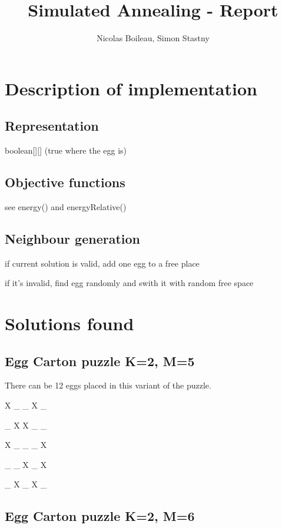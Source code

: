 \documentclass{article}
\begin{document}
\providecommand{\abs}[1]{\lvert#1\rvert}

\title{Simulated Annealing - Report}
\author{Nicolas Boileau, Simon Stastny}

\maketitle

\section{Description of implementation}

\subsection{Representation}
boolean[][] (true where the egg is)

\subsection{Objective functions}

see energy() and energyRelative()

\subsection{Neighbour generation}

if current solution is valid, add one egg to a free place

if it's invalid, find egg randomly and swith it with random free space

\section{Solutions found}

\subsection{Egg Carton puzzle K=2, M=5}

There can be 12 eggs placed in this variant of the puzzle.

X \_ \_ X \_ 

\_ X X \_ \_ 

X \_ \_ \_ X 

\_ \_ X \_ X 

\_ X \_ X \_ 

\subsection{Egg Carton puzzle K=2, M=6}
\end{document}
